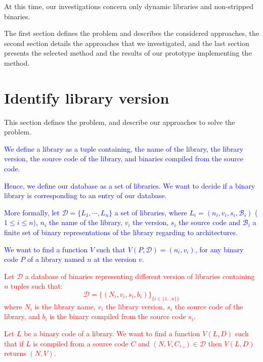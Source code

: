 \documentclass{article}
\newcommand{\ludo}[1]{\textcolor{blue}{#1}}
\newcommand{\thom}[1]{\textcolor{red}{#1}}
\begin{document}
    At this time, our investigations concern only dynamic libraries and non-stripped binaries.
    
    The first section defines the problem and describes the considered
    approaches, the second section details the approaches that we investigated, and the last section presents the selected method and the results of our prototype implementing the method.
    


   \section{Identify library version}
	This section defines the problem, and describe our approaches to solve the problem.

   \ludo{We define a library as a tuple containing, the name of the
   library, the library version, the source code of the library, and binaries
   compiled from the source code.}

   \ludo{Hence, we define our database as a set of libraries. We want to decide if a
   binary library is corresponding to an entry of our database.}

   \ludo{More formally, let $\mathcal{D} = \{ L_1, \cdots, L_n\}$ a set of libraries, where
   $L_i = (n_i, v_i, s_i, \mathcal{B}_i)$ ($1 \le i \le n$), $n_i$ the name of the library,
   $v_i$ the version, $s_i$ the source code and $\mathcal{B}_i$ a finite set of
   binary representations of the library regarding to architectures.}

   \ludo{We want to find a function $V$ such that $V(P,\mathcal{D}) = (n_i,
   v_i)$, for any binary code $P$ of a library named $n$ at the version $v$. }
   
   \thom{Let $\mathcal{D}$ a database of binaries representing different version of libraries containing $n$ tuples such that:
    \[ \mathcal{D} = \{ (N_i, v_i, s_i, b_i) \}_{\{i \in \{1 \dots n\}\}}  \]
    where $N_i$ is the library name, $v_i$ the library version, $s_i$ the source
    code of the library, and $b_i$ is the binary compiled from the source code
    $s_i$.}

    \thom{Let $L$ be a binary code of a library. We want to find a function
    $V(L,D)$ such that if $L$ is compiled from a source code $C$ and $(N, V,
    C, \_) \in \mathcal{D}$ then $V(L,D)$ returns $(N,V)$.}

\end{document}
